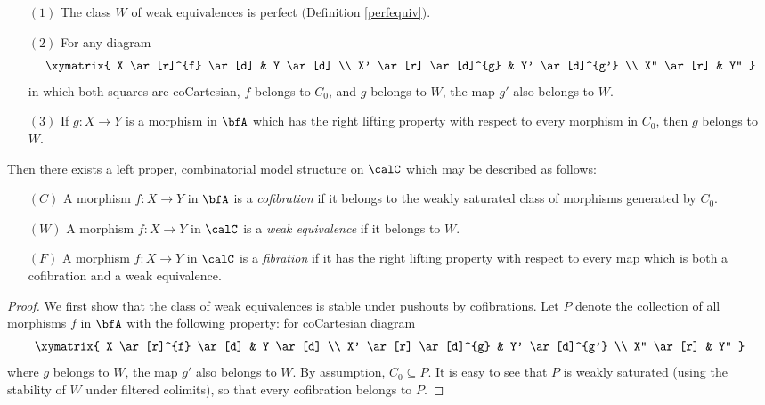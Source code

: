 \begin{Model Categories}
\begin{proposition}
\begin{itemize}
\item[$(1)$] The class $W$ of weak equivalences is perfect $($Definition \ref{perfequiv}$)$.
\item[$(2)$] For any diagram
$$ \xymatrix{ X \ar[r]^{f} \ar[d] & Y \ar[d] \\
	X' \ar[r] \ar[d]^{g} & Y' \ar[d]^{g'} \\
	X'' \ar[r] & Y'' } $$
in which both squares are coCartesian, $f$ belongs to $C_0$, and $g$ belongs to $W$, 
the map $g'$ also belongs to $W$.
\item[$(3)$] If $g: X \rightarrow Y$ is a morphism in $\bfA$ which has the right lifting property with respect to every morphism in $C_0$, then $g$ belongs to $W$. 
\end{itemize}

Then there exists a left proper, combinatorial model structure on $\calC$ which may be described as follows:

\begin{itemize}
\item[$(C)$] A morphism $f: X \rightarrow Y$ in $\bfA$ is a {\it cofibration} if it belongs to the weakly saturated class of morphisms generated by $C_0$.
\item[$(W)$] A morphism $f: X \rightarrow Y$ in $\calC$ is a {\it weak equivalence} if it belongs to $W$.
\item[$(F)$] A morphism $f: X \rightarrow Y$ in $\calC$ is a {\it fibration} if it has the right lifting property with respect to every map which is both a cofibration and a weak equivalence.
\end{itemize}
\end{proposition}

\begin{proof}
We first show that the class of weak equivalences is stable under pushouts by cofibrations.
Let $P$ denote the collection of all morphisms $f$ in $\bfA$ with the following property:
for coCartesian diagram
$$ \xymatrix{ X \ar[r]^{f} \ar[d] & Y \ar[d] \\
	X' \ar[r] \ar[d]^{g} & Y' \ar[d]^{g'} \\
	X'' \ar[r] & Y'' } $$
where $g$ belongs to $W$, the map $g'$ also belongs to $W$. By assumption, 
$C_0 \subseteq P$. It is easy to see that $P$ is weakly saturated (using the stability of $W$ under filtered colimits), so that every cofibration belongs to $P$. 


\end{proof}
\end{Model Categories}

